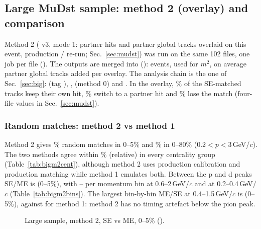 \subsection{Large MuDst sample: method 2 (overlay) and comparison}
\label{sec:bigm2}

Method 2 ( v3, mode 1: partner hits and partner global tracks overlaid on this event, production
/ re-run; Sec.~\ref{sec:mudst}) was run on the same 102 files, one job per file
(). The outputs are merged into  ():
\ovbigEvAll{} events, \ovbigEvMtwo{} used for $m^2$, on average \ovbigNTrkAdd{} partner global tracks added per overlay. The analysis
chain is the one of Sec.~\ref{sec:big}:  (tag ), ,
 (method 0) and . In the overlay, \ovbigSEkeep\% of the SE-matched
tracks keep their own hit, \ovbigSEswap\% switch to a partner hit and \ovbigSElose\% lose the match (four-file values in
Sec.~\ref{sec:mudst}).

\subsubsection{Random matches: method 2 vs method 1}
Method 2 gives \ovbigFrCi\% random matches in 0--5\% and \ovbigFrAll\% in 0--80\% ($0.2<p<3$\,GeV/$c$). The two methods agree within
\bigTwoOneFrDev\% (relative) in every centrality group (Table~\ref{tab:bigm2cent}), although method 2 uses production
calibration and production matching while method 1 emulates both. Between the p and d peaks SE/ME is \ovbigHiCi{} (0--5\%), with
\bigTwoHiMidMin--\bigTwoHiMidMax{} per momentum bin at 0.6--2\,GeV/$c$ and \bigTwoHiLow{} at 0.2--0.4\,GeV/$c$
(Table~\ref{tab:bigm2bins}). The largest bin-by-bin ME/SE at 0.4--1.5\,GeV/$c$ is \ovbigVmaxCi{} (0--5\%), against
\mubigVmaxProdCi{} for method 1: method 2 has no timing artefact below the pion peak.



\begin{figure}[H]
\centering
{}
\caption{Large sample, method 2, SE vs ME, 0--5\% ().}
\end{figure}

